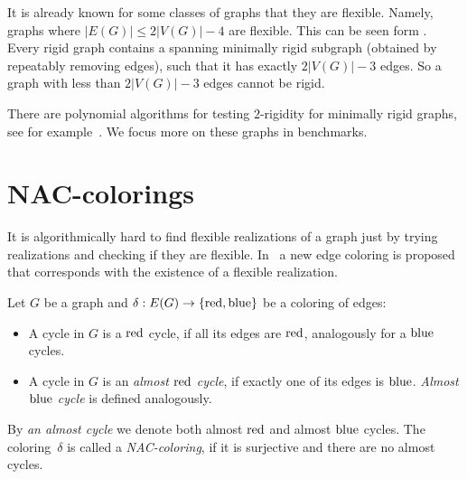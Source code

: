 It is already known for some classes of graphs that they are flexible.
Namely, graphs where \( |E(G)| \le 2|V(G)| - 4 \) are flexible.
This can be seen form .
Every rigid graph contains a spanning minimally rigid subgraph
(obtained by repeatably removing edges),
such that it has exactly \( 2|V(G)| - 3 \) edges.
So a graph with less than \( 2|V(G)| - 3 \) edges cannot be rigid.



There are polynomial algorithms for testing \( 2 \)-rigidity
for minimally rigid graphs, see for example~\cite{polynomial-min-rigid}.
We focus more on these graphs in benchmarks.


\section{NAC-colorings}

It is algorithmically hard to find flexible realizations of a graph
just by trying realizations and checking if they are flexible.
In~\cite{legersky_original} a new edge coloring is proposed
that corresponds with the existence of a flexible realization.


\begin{definition}
	Let \( G \) be a graph and \( \delta: E(G) \to \{ \text{red}, \text{blue} \} \)
	be a coloring of edges:
	\begin{itemize}
		\item A cycle in \( G \) is a \( \text{red} \) cycle, if all its edges are \( \text{red} \),
		      analogously for a \( \text{blue} \) cycles.
		\item A cycle in \( G \) is an \emph{almost \( \text{red} \) cycle},
		      if exactly one of its edges is \( \text{blue} \).
		      \emph{Almost \( \text{blue} \) cycle} is defined analogously.
	\end{itemize}
	By \emph{an almost cycle} we denote both almost \( \text{red} \) and almost \( \text{blue} \) cycles.
	The coloring~\( \delta \) is called a \emph{NAC-coloring}, if it is surjective
	and there are no almost cycles.
\end{definition}
%

